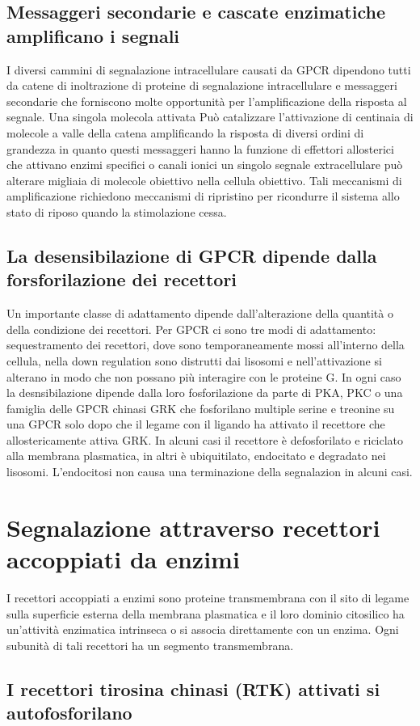 \subsection{Messaggeri secondarie e cascate enzimatiche amplificano i segnali}
I diversi cammini di segnalazione intracellulare causati da GPCR dipendono tutti da catene di inoltrazione di proteine di segnalazione intracellulare e messaggeri secondarie che 
forniscono molte opportunit\`a per l'amplificazione della risposta al segnale. Una singola molecola attivata Pu\`o catalizzare l'attivazione di centinaia di molecole a valle della
catena amplificando la risposta di diversi ordini di grandezza in quanto questi messaggeri hanno la funzione di effettori allosterici che attivano enzimi specifici o canali ionici
un singolo segnale extracellulare pu\`o alterare migliaia di molecole obiettivo nella cellula obiettivo. Tali meccanismi di amplificazione richiedono meccanismi di ripristino per
ricondurre il sistema allo stato di riposo quando la stimolazione cessa. 
\subsection{La desensibilazione di GPCR dipende dalla forsforilazione dei recettori}
Un importante classe di adattamento dipende dall'alterazione della quantit\`a o della condizione dei recettori. Per GPCR ci sono tre modi di adattamento: sequestramento dei recettori, 
dove sono temporaneamente mossi all'interno della cellula, nella down regulation sono distrutti dai lisosomi e nell'attivazione si alterano in modo che non possano pi\`u interagire 
con le proteine G. In ogni caso la desnsibilazione dipende dalla loro fosforilazione da parte di PKA, PKC o una famiglia delle GPCR chinasi GRK che fosforilano multiple serine e 
treonine su una GPCR solo dopo che il legame con il ligando ha attivato il recettore che allostericamente attiva GRK. In alcuni casi il recettore \`e defosforilato e riciclato 
alla membrana plasmatica, in altri \`e ubiquitilato, endocitato e degradato nei lisosomi. L'endocitosi non causa una terminazione della segnalazion in alcuni casi. 
\section{Segnalazione attraverso recettori accoppiati da enzimi}
I recettori accoppiati a enzimi sono proteine transmembrana con il sito di legame sulla superficie esterna della membrana plasmatica e il loro dominio citosilico ha un'attivit\`a 
enzimatica intrinseca o si associa direttamente con un enzima. Ogni subunit\`a di tali recettori ha un segmento transmembrana. 
\subsection{I recettori tirosina chinasi (RTK) attivati si autofosforilano}

